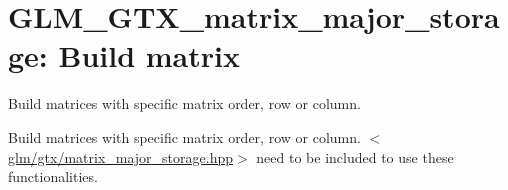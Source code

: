 \hypertarget{group__gtx__matrix__major__storage}{\section{\-G\-L\-M\-\_\-\-G\-T\-X\-\_\-matrix\-\_\-major\-\_\-storage\-: \-Build matrix}
\label{group__gtx__matrix__major__storage}
}


\-Build matrices with specific matrix order, row or column.  


\-Build matrices with specific matrix order, row or column. $<$\hyperlink{matrix__major__storage_8hpp}{glm/gtx/matrix\-\_\-major\-\_\-storage.\-hpp}$>$ need to be included to use these functionalities. 